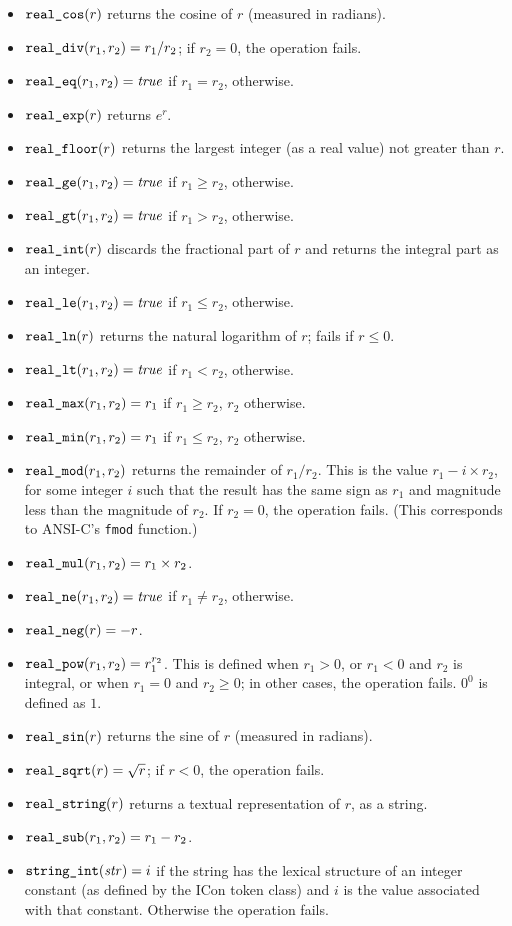 \begin{itemize}
\item $\mbox{\texttt{real\_cos}}(r)$ returns the cosine of $r$ (measured in radians).
\item $\mbox{\texttt{real\_div}}(r_1,r_2) = r_1 / r_2$; if $r_2 = 0$, the operation fails.
\item $\mbox{\texttt{real\_eq}}(r_1,r_2) = \mbox{\textit{true}}$ if $r_1 = r_2$,  otherwise.
\item $\mbox{\texttt{real\_exp}}(r)$ returns $e^r$.
\item $\mbox{\texttt{real\_floor}}(r)$ returns the largest integer (as a real value)
not greater than $r$.
\item $\mbox{\texttt{real\_ge}}(r_1,r_2) = \mbox{\textit{true}}$ if $r_1 \geq r_2$,  otherwise.
\item $\mbox{\texttt{real\_gt}}(r_1,r_2) = \mbox{\textit{true}}$ if $r_1 > r_2$,  otherwise.
\item $\mbox{\texttt{real\_int}}(r)$ discards the fractional part of $r$ and returns
the integral part as an integer.
\item $\mbox{\texttt{real\_le}}(r_1,r_2) = \mbox{\textit{true}}$ if $r_1 \leq r_2$,  otherwise.
\item $\mbox{\texttt{real\_ln}}(r)$ returns the natural logarithm of $r$; fails if $r\leq 0$.
\item $\mbox{\texttt{real\_lt}}(r_1,r_2) = \mbox{\textit{true}}$ if $r_1 < r_2$,  otherwise.
\item $\mbox{\texttt{real\_max}}(r_1,r_2) = r_1$ if $r_1 \geq r_2$, $r_2$ otherwise.
\item $\mbox{\texttt{real\_min}}(r_1,r_2) = r_1$ if $r_1 \leq r_2$, $r_2$ otherwise.
\item $\mbox{\texttt{real\_mod}}(r_1,r_2)$ returns the remainder of $r_1 / r_2$. This
is the value $r_1 - i \times r_2$, for some integer $i$ such that the result
has the same sign as $r_1$ and magnitude less than the magnitude of $r_2$.
If $r_2 = 0$, the operation fails. (This corresponds to ANSI-C's \texttt{fmod} function.)
\item $\mbox{\texttt{real\_mul}}(r_1,r_2) = r_1 \times r_2$.
\item $\mbox{\texttt{real\_ne}}(r_1,r_2) = \mbox{\textit{true}}$ if $r_1 \neq r_2$,  otherwise.
\item $\mbox{\texttt{real\_neg}}(r) = -r$.
\item $\mbox{\texttt{real\_pow}}(r_1,r_2) = r_1^{r_2}$. This is defined when $r_1 > 0$,
or $r_1 < 0$ and $r_2$ is integral, or when $r_1 = 0$ and $r_2 \geq 0$;
in other cases, the operation fails. $0^0$ is defined as $1$.
\item $\mbox{\texttt{real\_sin}}(r)$ returns the sine of $r$ (measured in radians).
\item $\mbox{\texttt{real\_sqrt}}(r) = \sqrt{r}$; if $r < 0$, the operation fails.
\item $\mbox{\texttt{real\_string}}(r)$ returns a textual representation of $r$, as a string.
\item $\mbox{\texttt{real\_sub}}(r_1,r_2) = r_1 - r_2$.
\item $\mbox{\texttt{string\_int}}(\mbox{\textit{str}}) = i$ if the string has the lexical structure
of an integer constant (as defined by the ICon token class) and $i$
is the value associated with that constant. Otherwise the operation fails.
\end{itemize}

